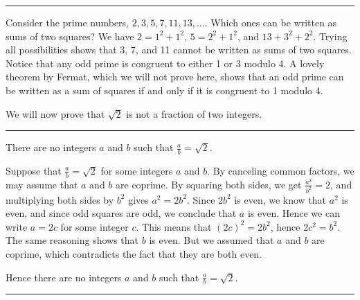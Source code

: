 \documentclass[letterpaper,10pt,english]{sphinxmanual}
\begin{document}
\bigskip\hrule\bigskip


\sphinxAtStartPar
Consider the prime numbers, \(2, 3, 5, 7, 11, 13, \ldots\). Which ones can be written as sums of two squares? We have \(2 = 1^2 + 1^2\), \(5 = 2^2 + 1^2\), and \(13 + 3^2 + 2^2\). Trying all possibilities shows that 3, 7, and 11 cannot be written as sums of two squares. Notice that any odd prime is congruent to either 1 or 3 modulo 4. A lovely theorem by Fermat, which we will not prove here, shows that an odd prime can be written as a sum of squares if and only if it is congruent to 1 modulo 4.

\sphinxAtStartPar
We will now prove that \(\sqrt{2}\) is not a fraction of two integers.


\bigskip\hrule\bigskip


\sphinxAtStartPar
{} There are no integers \(a\) and \(b\) such that \(\frac ab=\sqrt{2}\).

\sphinxAtStartPar
{} Suppose that \(\frac ab=\sqrt{2}\) for some integers \(a\) and \(b\). By canceling common factors, we may assume that \(a\) and \(b\) are coprime. By squaring both sides, we get \(\frac{a^2}{b^2}=2\), and multiplying both sides by \(b^2\) gives \(a^2=2b^2\). Since \(2b^2\) is even, we know that \(a^2\) is even, and since odd squares are odd, we conclude that \(a\) is even. Hence we can write \(a = 2c\) for some integer \(c\). This means that \((2c)^2=2b^2\), hence \(2c^2=b^2\). The same reasoning shows that \(b\) is even. But we assumed that \(a\) and \(b\) are coprime, which contradicts the fact that they are both even.

\sphinxAtStartPar
Hence there are no integers \(a\) and \(b\) such that \(\frac ab=\sqrt{2}\).


\bigskip\hrule\bigskip
\end{document}
